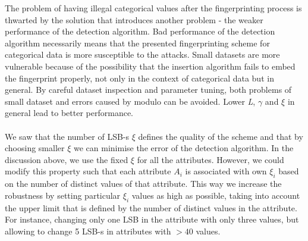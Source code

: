 \begin{table}[ht]
    \centering
    \caption{The detection fail rates for Adult data}
    \label{tab:adult-detection-rates}
\end{table}


The problem of having illegal categorical values after the fingerprinting process is thwarted by the solution that introduces another problem - the weaker performance of the detection algorithm. 
Bad performance of the detection algorithm necessarily means that the presented fingerprinting scheme for categorical data is more susceptible to the attacks.
Small datasets are more vulnerable because of the possibility that the insertion algorithm fails to embed the fingerprint properly, not only in the context of categorical data but in general.
By careful dataset inspection and parameter tuning, both problems of small dataset and errors caused by modulo can be avoided. 
Lower \textit{L}, $\gamma$ and $\xi$ in general lead to better performance.

\paragraph{}
We saw that the number of LSB-s $\xi$ defines the quality of the scheme and that by choosing smaller $\xi$ we can minimise the error of the detection algorithm. 
In the discussion above, we use the fixed $\xi$ for all the attributes. 
However, we could modify this property such that each attribute $A_i$ is associated with own $\xi_i$ based on the number of distinct values of that attribute. 
This way we increase the robustness by setting particular $\xi_i$ values as high as possible, taking into account the upper limit that is defined by the number of distinct values in the attribute. 
For instance, changing only one LSB in the attribute with only three values, but allowing to change 5 LSB-s in attributes with $>40$ values. 

